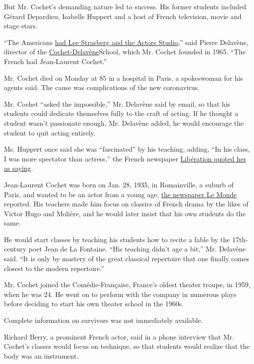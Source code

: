 But Mr. Cochet's demanding nature led to success. His former students
included Gérard Depardieu, Isabelle Huppert and a host of French
television, movie and stage stars.

``The Americans
\href{https://www.nytimes.com/1982/02/18/obituaries/lee-strasberg-of-actors-studio-dead.html}{had
Lee Strasberg and the Actors Studio},'' said Pierre Delavène, director
of the
\href{https://www.courscochetdelavene.fr/}{Cochet-Delavène}School, which
Mr. Cochet founded in 1965. ``The French had Jean-Laurent Cochet.''

Mr. Cochet died on Monday at 85 in a hospital in Paris, a spokeswoman
for his agents said. The cause was complications of the new coronavirus.

Mr. Cochet ``asked the impossible,'' Mr. Delavène said by email, so that
his students could dedicate themselves fully to the craft of acting. If
he thought a student wasn't passionate enough, Mr. Delavène added, he
would encourage the student to quit acting entirely.

Ms. Huppert once said she was ``fascinated'' by his teaching, adding,
``In his class, I was more spectator than actress,'' the French
newspaper
\href{https://next.liberation.fr/culture/2020/04/07/mort-de-jean-laurent-cochet-maitre-des-acteurs-francais_1784481}{Libération
quoted her as saying}.

Jean-Laurent Cochet was born on Jan. 28, 1935, in Romainville, a suburb
of Paris, and wanted to be an actor from a young age,
\href{https://www.lemonde.fr/disparitions/article/2020/04/07/le-metteur-en-scene-jean-laurent-cochet-est-mort_6035879_3382.html}{the
newspaper Le Monde} reported. His teachers made him focus on classics of
French drama by the likes of Victor Hugo and Molière, and he would later
insist that his own students do the same.

He would start classes by teaching his students how to recite a fable by
the 17th-century poet Jean de La Fontaine. ``His teaching didn't age a
bit,'' Mr. Delavène said. ``It is only by mastery of the great classical
repertoire that one finally comes closest to the modern repertoire.''

Mr. Cochet joined the Comédie-Française, France's oldest theater troupe,
in 1959, when he was 24. He went on to perform with the company in
numerous plays before deciding to start his own theater school in the
1960s.

Complete information on survivors was not immediately available.

Richard Berry, a prominent French actor, said in a phone interview that
Mr. Cochet's classes would focus on technique, so that students would
realize that the body was an instrument.

